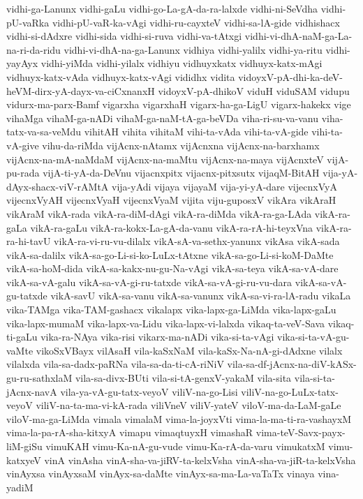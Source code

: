 {vidhi-ga-Lanunx
vidhi-gaLu
vidhi-go-La-gA-da-ra-lalxde
vidhi-ni-SeVdha
vidhi-pU-vaRka
vidhi-pU-vaR-ka-vAgi
vidhi-ru-cayxteV
vidhi-sa-lA-gide
vidhishacx
vidhi-si-dAdxre
vidhi-sida
vidhi-si-ruva
vidhi-va-tAtxgi
vidhi-vi-dhA-naM-ga-La-na-ri-da-ridu
vidhi-vi-dhA-na-ga-Lanunx
vidhiya
vidhi-yalilx
vidhi-ya-ritu
vidhi-yayAyx
vidhi-yiMda
vidhi-yilalx
vidhiyu
vidhuyxkatx
vidhuyx-katx-mAgi
vidhuyx-katx-vAda
vidhuyx-katx-vAgi
vididhx
vidita
vidoyxV-pA-dhi-ka-deV-heVM-dirx-yA-dayx-va-ciCxnanxH
vidoyxV-pA-dhikoV
viduH
viduSAM
vidupu
vidurx-ma-parx-Bamf
vigarxha
vigarxhaH
vigarx-ha-ga-LigU
vigarx-hakekx
vige
vihaMga
vihaM-ga-nADi
vihaM-ga-naM-tA-ga-beVDa
viha-ri-su-va-vanu
viha-tatx-va-sa-veMdu
vihitAH
vihita
vihitaM
vihi-ta-vAda
vihi-ta-vA-gide
vihi-ta-vA-give
vihu-da-riMda
vijAcnx-nAtamx
vijAcnxna
vijAcnx-na-barxhamx
vijAcnx-na-mA-naMdaM
vijAcnx-na-maMtu
vijAcnx-na-maya
vijAcnxteV
vijA-pu-rada
vijA-ti-yA-da-DeVnu
vijacnxpitx
vijacnx-pitxsutx
vijaqM-BitAH
vija-yA-dAyx-shacx-viV-rAMtA
vija-yAdi
vijaya
vijayaM
vija-yi-yA-dare
vijecnxVyA
vijecnxVyAH
vijecnxVyaH
vijecnxVyaM
vijita
viju-guposxV
vikAra
vikAraH
vikAraM
vikA-rada
vikA-ra-diM-dAgi
vikA-ra-diMda
vikA-ra-ga-LAda
vikA-ra-gaLa
vikA-ra-gaLu
vikA-ra-kokx-La-gA-da-vanu
vikA-ra-rA-hi-teyxVna
vikA-ra-ra-hi-tavU
vikA-ra-vi-ru-vu-dilalx
vikA-sA-va-sethx-yanunx
vikAsa
vikA-sada
vikA-sa-dalilx
vikA-sa-go-Li-si-ko-LuLx-tAtxne
vikA-sa-go-Li-si-koM-DaMte
vikA-sa-hoM-dida
vikA-sa-kakx-nu-gu-Na-vAgi
vikA-sa-teya
vikA-sa-vA-dare
vikA-sa-vA-galu
vikA-sa-vA-gi-ru-tatxde
vikA-sa-vA-gi-ru-vu-dara
vikA-sa-vA-gu-tatxde
vikA-savU
vikA-sa-vanu
vikA-sa-vanunx
vikA-sa-vi-ra-lA-radu
vikaLa
vika-TAMga
vika-TAM-gashacx
vikalapx
vika-lapx-ga-LiMda
vika-lapx-gaLu
vika-lapx-mumaM
vika-lapx-va-Lidu
vika-lapx-vi-lalxda
vikaq-ta-veV-Sava
vikaq-ti-gaLu
vika-ra-NAya
vika-risi
vikarx-ma-nADi
vika-si-ta-vAgi
vika-si-ta-vA-gu-vaMte
vikoSxVBayx
vilAsaH
vila-kaSxNaM
vila-kaSx-Na-nA-gi-dAdxne
vilalx
vilalxda
vila-sa-dadx-paRNa
vila-sa-da-ti-cA-riNiV
vila-sa-df-jAcnx-na-diV-kASx-gu-ru-sathxlaM
vila-sa-divx-BUti
vila-si-tA-genxV-yakaM
vila-sita
vila-si-ta-jAcnx-navA
vila-ya-vA-gu-tatx-veyoV
viliV-na-go-Lisi
viliV-na-go-LuLx-tatx-veyoV
viliV-na-ta-ma-vi-kA-rada
viliVneV
viliV-yateV
viloV-ma-da-LaM-gaLe
viloV-ma-ga-LiMda
vimala
vimalaM
vima-la-joyxVti
vima-la-ma-ti-ra-vashayxM
vima-la-pa-rA-sha-kitxyA
vimapu
vimaqtuyxH
vimashaR
vima-teV-Savx-payx-liM-giSu
vimuKAH
vimu-Ka-nA-gu-vude
vimu-Ka-rA-da-varu
vimukatxM
vimu-katxyeV
vinA
vinAsha
vinA-sha-va-jiRV-ta-kelxVsha
vinA-sha-va-jiR-ta-kelxVsha
vinAyxsa
vinAyxsaM
vinAyx-sa-daMte
vinAyx-sa-ma-La-vaTaTx
vinaya
vina-yadiM
}
